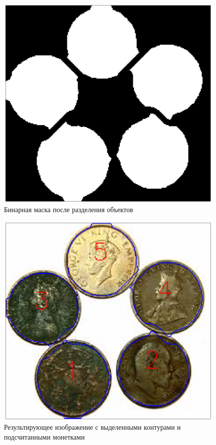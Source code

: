 \begin{figure}[H]
    \includegraphics[width=\textwidth]{../outputs/2_diff.png}
    \caption{Бинарная маска после разделения объектов}
\end{figure}

\begin{figure}[H]
    \includegraphics[width=\textwidth]{../outputs/2_edge.png}
    \caption{Результирующее изображение с выделенными контурами и подсчитанными монетками}
\end{figure}


